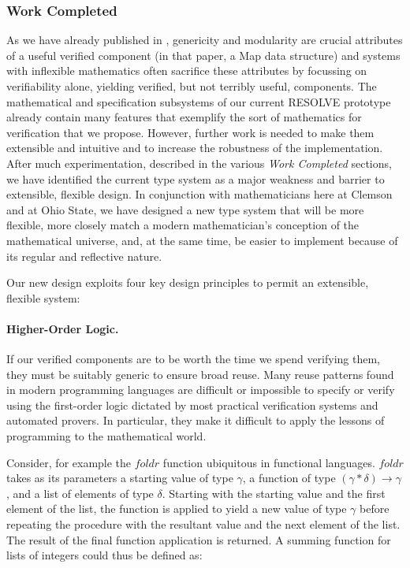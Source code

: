 \subsubsection{Work Completed}
As we have already published in \cite{bronishMap}, genericity and modularity are crucial attributes of a useful verified component (in that paper, a Map data structure) and systems with inflexible mathematics often sacrifice these attributes by focussing on verifiability alone, yielding verified, but not terribly useful, components.  The mathematical and specification subsystems of our current RESOLVE prototype already contain many features that exemplify the sort of mathematics for verification that we propose.  However, further work is needed to make them extensible and intuitive and to increase the robustness of the implementation.  After much experimentation, described in the various \emph{Work Completed} sections, we have identified the current type system as a major weakness and barrier to extensible, flexible design.  In conjunction with mathematicians here at Clemson and at Ohio State, we have designed a new type system that will be more flexible, more closely match a modern mathematician's conception of the mathematical universe, and, at the same time, be easier to implement because of its regular and reflective nature.

Our new design exploits four key design principles to permit an extensible, flexible system:

\paragraph{Higher-Order Logic.}\label{sec:higherOrderDefinitions}
If our verified components are to be worth the time we spend verifying them, they must be suitably generic to ensure broad reuse.  Many reuse patterns found in modern programming languages are difficult or impossible to specify or verify using the first-order logic dictated by most practical verification systems and automated provers.  In particular, they make it difficult to apply the lessons of programming to the mathematical world.

Consider, for example the $foldr$ function ubiquitous in functional languages.  $foldr$ takes as its parameters a starting value of type $\gamma$, a function of type $(\gamma*\delta)\rightarrow\gamma$, and a list of elements of type $\delta$.  Starting with the starting value and the first element of the list, the function is applied to yield a new value of type $\gamma$ before repeating the procedure with the resultant value and the next element of the list.  The result of the final function application is returned.  A summing function for lists of integers could thus be defined as:

